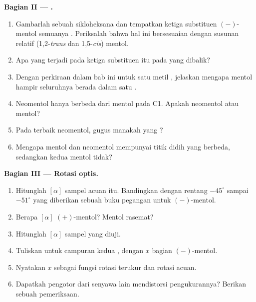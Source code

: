 \begin{problem}
\medskip
\noindent\textbf{Bagian II --- .}
\begin{enumerate}[resume]
  \item Gambarlah sebuah  sikloheksana dan tempatkan ketiga substituen
        $(-)$-mentol semuanya . Periksalah bahwa hal ini
        bersesuaian dengan susunan relatif (1,2-\textit{trans} dan
        1,5-\textit{cis}) mentol.
  \item Apa yang terjadi pada ketiga substituen itu pada  yang
        dibalik?
  \item Dengan perkiraan dalam bab ini untuk satu metil , jelaskan
        mengapa mentol hampir seluruhnya berada dalam satu .
  \item Neomentol hanya berbeda dari mentol pada C1. Apakah neomentol
         atau  mentol?
  \item Pada  terbaik neomentol, gugus manakah yang ?
  \item Mengapa mentol dan neomentol mempunyai titik didih yang berbeda,
        sedangkan kedua  mentol tidak?
\end{enumerate}

\medskip
\noindent\textbf{Bagian III --- Rotasi optis.}
\begin{enumerate}[resume]
  \item Hitunglah $[\alpha]$ sampel acuan itu. Bandingkan dengan rentang
        $-45^\circ$ sampai $-51^\circ$ yang diberikan sebuah buku pegangan
        untuk $(-)$-mentol.
  \item Berapa $[\alpha]$ $(+)$-mentol? Mentol rasemat?
  \item Hitunglah $[\alpha]$ sampel yang diuji.
  \item Tuliskan  untuk campuran kedua , dengan $x$
        bagian $(-)$-mentol.
  \item Nyatakan $x$ sebagai fungsi rotasi terukur dan rotasi acuan.
  \item Dapatkah pengotor  dari senyawa lain mendistorsi
        pengukurannya? Berikan sebuah pemeriksaan.
\end{enumerate}


\end{problem}
